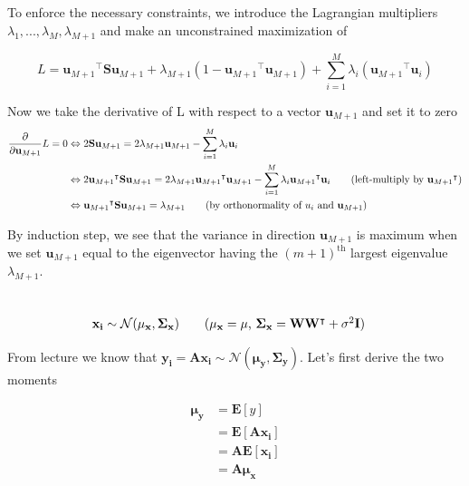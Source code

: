 \documentclass[11pt]{article}
\newcommand{\exercise}{\section{}}
\newcommand{\sumf}[3]{\sum_{#1}^{#2} #3}
\newcommand{\tf}[1]{{#1}^{\intercal}}
\newcommand{\partialf}[1]{\frac{\partial}{{\partial #1}}}
\begin{document}
\exercise

To enforce the necessary constraints, we introduce the Lagrangian multipliers $\lambda_{1}, ..., \lambda_{M}, \lambda_{M+1}$ and make an unconstrained maximization of 

$$L = \tf{\mathbf{u}_{M+1}} \mathbf{S} \mathbf{u}_{M+1}  + \lambda_{M+1}(1 - \tf{\mathbf{u}_{M+1}} \mathbf{u}_{M+1}) + \sumf{i=1}{M}{\lambda_i (\tf{\mathbf{u}_{M+1}} \mathbf{u}_{i} )}$$

\noindent Now we take the derivative of L with respect to a vector $\mathbf{u}_{M+1}$ and set it to zero
\begin{align*}
\partialf{\mathbf{u}_{M+1}} L = 0 &\Leftrightarrow 2 \mathbf{S} \mathbf{u}_{M+1} = 2 \lambda_{M+1} \mathbf{u}_{M+1} - \sumf{i=1}{M}{\lambda_i \mathbf{u}_{i}} \\
&\Leftrightarrow 2 \tf{\mathbf{u}_{M+1}} \mathbf{S} \mathbf{u}_{M+1} = 2 \lambda_{M+1} \tf{\mathbf{u}_{M+1}} \mathbf{u}_{M+1} - \sumf{i=1}{M}{\lambda_i \tf{\mathbf{u}_{M+1}} \mathbf{u}_{i}} \tag{left-multiply by $\tf{\mathbf{u}_{M+1}}$} \\
&\Leftrightarrow \tf{\mathbf{u}_{M+1}} \mathbf{S} \mathbf{u}_{M+1} = \lambda_{M+1} \tag{by orthonormality of $u_i$ and $\mathbf{u}_{M+1}$} \\
\end{align*}

\noindent  By induction step, we see that the variance in direction $\mathbf{u}_{M+1}$  is maximum when we set $\mathbf{u}_{M+1}$ equal to the eigenvector having the $(m+1)^{\text{th}}$ largest eigenvalue $\lambda_{M+1}$.

\exercise

\begin{align*}
\mathbf{x_i} &\sim \mathcal{N}(\mathbf{\mu_x}, \mathbf{\Sigma_x}) \tag{$\mathbf{\mu_x} = \mathbf{\mu}$, $\mathbf{\Sigma_x} = \mathbf{W} \tf{\mathbf{W}} + \sigma^2 \mathbf{I}$}
\end{align*}

\noindent From lecture we know that $\mathbf{y_i} = \mathbf{A} \mathbf{x_i} \sim \mathcal{N}(\mathbf{\mu_y}, \mathbf{\Sigma_y}) $. Let's first derive the two moments

\begin{align*}
\mathbf{\mu_y} &= \mathbf{E}[y] \\
&= \mathbf{E}[\mathbf{A} \mathbf{x_i}] \\
&= \mathbf{A} \mathbf{E}[\mathbf{x_i}] \\
&= \mathbf{A} \mathbf{\mu_x}
\end{align*}
\end{document}
